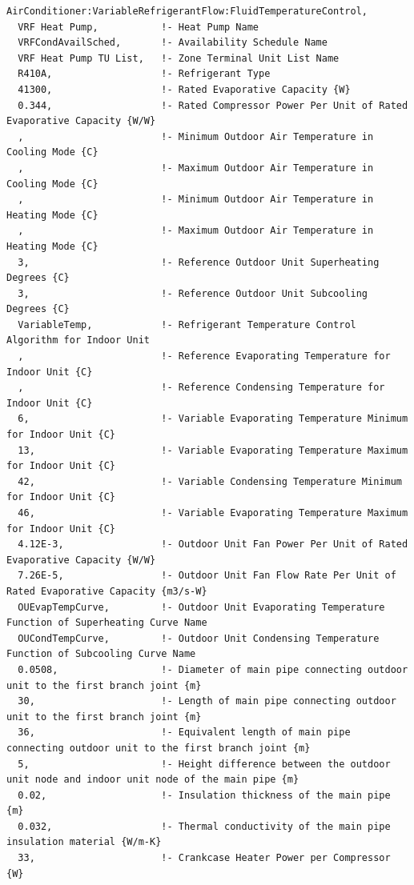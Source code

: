 \begin{lstlisting}
AirConditioner:VariableRefrigerantFlow:FluidTemperatureControl,
  VRF Heat Pump,           !- Heat Pump Name
  VRFCondAvailSched,       !- Availability Schedule Name
  VRF Heat Pump TU List,   !- Zone Terminal Unit List Name
  R410A,                   !- Refrigerant Type
  41300,                   !- Rated Evaporative Capacity {W}
  0.344,                   !- Rated Compressor Power Per Unit of Rated Evaporative Capacity {W/W}
  ,                        !- Minimum Outdoor Air Temperature in Cooling Mode {C}
  ,                        !- Maximum Outdoor Air Temperature in Cooling Mode {C}
  ,                        !- Minimum Outdoor Air Temperature in Heating Mode {C}
  ,                        !- Maximum Outdoor Air Temperature in Heating Mode {C}
  3,                       !- Reference Outdoor Unit Superheating Degrees {C}
  3,                       !- Reference Outdoor Unit Subcooling Degrees {C}
  VariableTemp,            !- Refrigerant Temperature Control Algorithm for Indoor Unit
  ,                        !- Reference Evaporating Temperature for Indoor Unit {C}
  ,                        !- Reference Condensing Temperature for Indoor Unit {C}
  6,                       !- Variable Evaporating Temperature Minimum for Indoor Unit {C}
  13,                      !- Variable Evaporating Temperature Maximum for Indoor Unit {C}
  42,                      !- Variable Condensing Temperature Minimum for Indoor Unit {C}
  46,                      !- Variable Evaporating Temperature Maximum for Indoor Unit {C}
  4.12E-3,                 !- Outdoor Unit Fan Power Per Unit of Rated Evaporative Capacity {W/W}
  7.26E-5,                 !- Outdoor Unit Fan Flow Rate Per Unit of Rated Evaporative Capacity {m3/s-W}
  OUEvapTempCurve,         !- Outdoor Unit Evaporating Temperature Function of Superheating Curve Name
  OUCondTempCurve,         !- Outdoor Unit Condensing Temperature Function of Subcooling Curve Name
  0.0508,                  !- Diameter of main pipe connecting outdoor unit to the first branch joint {m}
  30,                      !- Length of main pipe connecting outdoor unit to the first branch joint {m}
  36,                      !- Equivalent length of main pipe connecting outdoor unit to the first branch joint {m}
  5,                       !- Height difference between the outdoor unit node and indoor unit node of the main pipe {m}
  0.02,                    !- Insulation thickness of the main pipe {m}
  0.032,                   !- Thermal conductivity of the main pipe insulation material {W/m-K}
  33,                      !- Crankcase Heater Power per Compressor {W}

\end{lstlisting}
